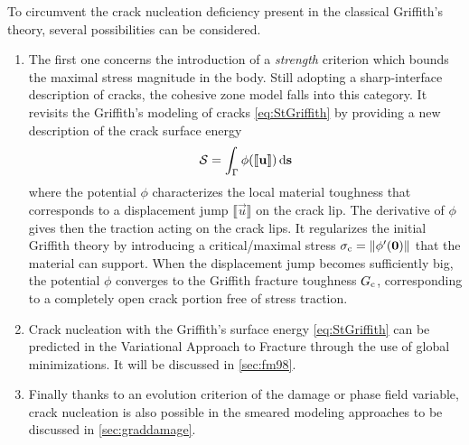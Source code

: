 To circumvent the crack nucleation deficiency present in the classical Griffith's theory, several possibilities can be considered.
\begin{enumerate}
\item The first one concerns the introduction of a \emph{strength} criterion which bounds the maximal stress magnitude in the body. Still adopting a sharp-interface description of cracks, the cohesive zone model \cite{Barenblatt:1962,ElicesGuineaGomezPlanas:2002} falls into this category. It revisits the Griffith's modeling of cracks \eqref{eq:StGriffith} by providing a new description of the crack surface energy
\begin{equation} \label{eq:cohesiveSt}
\mathcal{S}=\int_{\Gamma}\phi(\llbracket\vec{u}\rrbracket)\ds
\end{equation}
where the potential $\phi$ characterizes the local material toughness that corresponds to a displacement jump $\llbracket\vec{u}\rrbracket$ on the crack lip. The derivative of $\phi$ gives then the traction acting on the crack lips. It regularizes the initial Griffith theory by introducing a critical/maximal stress $\sigma_\mc=\norm{\phi'(\vec{0})}$ that the material can support. When the displacement jump becomes sufficiently big, the potential $\phi$ converges to the Griffith fracture toughness $G_\mathrm{c}$, corresponding to a completely open crack  portion free of stress traction.

\item Crack nucleation with the Griffith's surface energy \eqref{eq:StGriffith} can be predicted in the Variational Approach to Fracture through the use of global minimizations. It will be discussed in \cref{sec:fm98}.

\item Finally thanks to an evolution criterion of the damage or phase field variable, crack nucleation is also possible in the smeared modeling approaches to be discussed in \cref{sec:graddamage}.
\end{enumerate}

